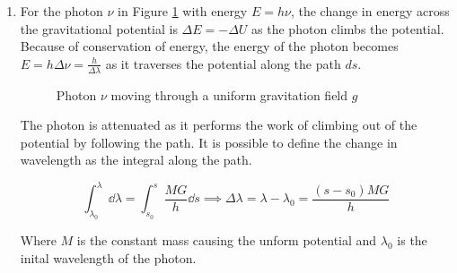 \documentclass{paper}
\begin{document}
\begin{enumerate}
    \item %
      For the photon \(\nu\) in Figure \ref{fig:field} with energy 
      \(E = h \nu\), the change in energy across the gravitational potential 
      is \(\Delta{E}=-\Delta{U}\) as the photon climbs the potential. Because 
      of conservation of energy, the energy of the photon becomes 
      \(E = h \Delta{\nu} = \frac{h}{\Delta\lambda}\) as it traverses the potential
      along the path \(ds\).

      \begin{figure}[!htb]
        \begin{center}
        \end{center}

        \caption{Photon \(\nu\) moving through a uniform gravitation 
          field \(g\)}
        \label{fig:field}
      \end{figure}

      The photon is attenuated as it performs the work of climbing out of the
      potential by following the path. It is possible to define the change
      in wavelength as the integral along the path.

      \[ \int_{\lambda_{0}}^{\lambda} \dd{\lambda} = 
      \int_{s_{0}}^{s} \frac{M G}{h} \dd{s} \implies \Delta\lambda = 
      \lambda - \lambda_{0} = \frac{(s-s_{0}) M G}{h}\]

      Where \( M \) is the constant mass causing the unform potential and
      \( \lambda_{0} \) is the inital wavelength of the photon.


\end{enumerate}
\end{document}
